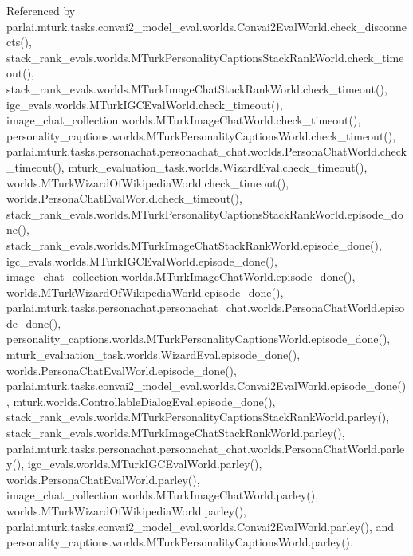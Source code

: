 Referenced by parlai.\+mturk.\+tasks.\+convai2\+\_\+model\+\_\+eval.\+worlds.\+Convai2\+Eval\+World.\+check\+\_\+disconnects(), stack\+\_\+rank\+\_\+evals.\+worlds.\+M\+Turk\+Personality\+Captions\+Stack\+Rank\+World.\+check\+\_\+timeout(), stack\+\_\+rank\+\_\+evals.\+worlds.\+M\+Turk\+Image\+Chat\+Stack\+Rank\+World.\+check\+\_\+timeout(), igc\+\_\+evals.\+worlds.\+M\+Turk\+I\+G\+C\+Eval\+World.\+check\+\_\+timeout(), image\+\_\+chat\+\_\+collection.\+worlds.\+M\+Turk\+Image\+Chat\+World.\+check\+\_\+timeout(), personality\+\_\+captions.\+worlds.\+M\+Turk\+Personality\+Captions\+World.\+check\+\_\+timeout(), parlai.\+mturk.\+tasks.\+personachat.\+personachat\+\_\+chat.\+worlds.\+Persona\+Chat\+World.\+check\+\_\+timeout(), mturk\+\_\+evaluation\+\_\+task.\+worlds.\+Wizard\+Eval.\+check\+\_\+timeout(), worlds.\+M\+Turk\+Wizard\+Of\+Wikipedia\+World.\+check\+\_\+timeout(), worlds.\+Persona\+Chat\+Eval\+World.\+check\+\_\+timeout(), stack\+\_\+rank\+\_\+evals.\+worlds.\+M\+Turk\+Personality\+Captions\+Stack\+Rank\+World.\+episode\+\_\+done(), stack\+\_\+rank\+\_\+evals.\+worlds.\+M\+Turk\+Image\+Chat\+Stack\+Rank\+World.\+episode\+\_\+done(), igc\+\_\+evals.\+worlds.\+M\+Turk\+I\+G\+C\+Eval\+World.\+episode\+\_\+done(), image\+\_\+chat\+\_\+collection.\+worlds.\+M\+Turk\+Image\+Chat\+World.\+episode\+\_\+done(), worlds.\+M\+Turk\+Wizard\+Of\+Wikipedia\+World.\+episode\+\_\+done(), parlai.\+mturk.\+tasks.\+personachat.\+personachat\+\_\+chat.\+worlds.\+Persona\+Chat\+World.\+episode\+\_\+done(), personality\+\_\+captions.\+worlds.\+M\+Turk\+Personality\+Captions\+World.\+episode\+\_\+done(), mturk\+\_\+evaluation\+\_\+task.\+worlds.\+Wizard\+Eval.\+episode\+\_\+done(), worlds.\+Persona\+Chat\+Eval\+World.\+episode\+\_\+done(), parlai.\+mturk.\+tasks.\+convai2\+\_\+model\+\_\+eval.\+worlds.\+Convai2\+Eval\+World.\+episode\+\_\+done(), mturk.\+worlds.\+Controllable\+Dialog\+Eval.\+episode\+\_\+done(), stack\+\_\+rank\+\_\+evals.\+worlds.\+M\+Turk\+Personality\+Captions\+Stack\+Rank\+World.\+parley(), stack\+\_\+rank\+\_\+evals.\+worlds.\+M\+Turk\+Image\+Chat\+Stack\+Rank\+World.\+parley(), parlai.\+mturk.\+tasks.\+personachat.\+personachat\+\_\+chat.\+worlds.\+Persona\+Chat\+World.\+parley(), igc\+\_\+evals.\+worlds.\+M\+Turk\+I\+G\+C\+Eval\+World.\+parley(), worlds.\+Persona\+Chat\+Eval\+World.\+parley(), image\+\_\+chat\+\_\+collection.\+worlds.\+M\+Turk\+Image\+Chat\+World.\+parley(), worlds.\+M\+Turk\+Wizard\+Of\+Wikipedia\+World.\+parley(), parlai.\+mturk.\+tasks.\+convai2\+\_\+model\+\_\+eval.\+worlds.\+Convai2\+Eval\+World.\+parley(), and personality\+\_\+captions.\+worlds.\+M\+Turk\+Personality\+Captions\+World.\+parley().

